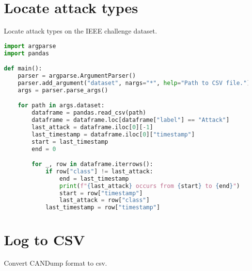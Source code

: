 \section{Locate attack types}

Locate attack types on the IEEE challenge dataset.

\begin{lstlisting}[language=Python]
import argparse
import pandas

def main():
    parser = argparse.ArgumentParser()
    parser.add_argument("dataset", nargs="*", help="Path to CSV file.")
    args = parser.parse_args()

    for path in args.dataset:
        dataframe = pandas.read_csv(path)
        dataframe = dataframe.loc[dataframe["label"] == "Attack"]
        last_attack = dataframe.iloc[0][-1]
        last_timestamp = dataframe.iloc[0]["timestamp"]
        start = last_timestamp
        end = 0

        for _, row in dataframe.iterrows():
            if row["class"] != last_attack:
                end = last_timestamp
                print(f"{last_attack} occurs from {start} to {end}")
                start = row["timestamp"]
                last_attack = row["class"]
            last_timestamp = row["timestamp"]
\end{lstlisting}

\section{Log to CSV}

Convert CANDump format to \gls{csv}.

